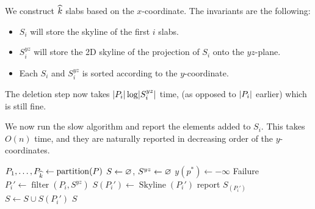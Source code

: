 \begin{solution}
    We construct $\widehat{k}$ slabs based on the $x$-coordinate.
    The invariants are the following:
    \begin{itemize}
        \item $S_i$ will store the skyline of the first $i$ slabs.
        \item $S_i^{yz}$ will store the 2D skyline of the projection of
            $S_i$ onto the $yz$-plane.
        \item Each $S_i$ and $S_i^{yz}$ is sorted according to the
            $y$-coordinate.
    \end{itemize}
    The deletion step now takes $\lvert P_i\rvert \log \lvert S_i^{yz}\rvert$ time,
    (as opposed to $\lvert P_i\rvert$ earlier)
    which is still fine.

    We now run the slow algorithm and report the elements added to $S_i$.
    This takes $O(n)$ time, and they are naturally reported in decreasing
    order of the $y$-coordinates.
    \begin{algo}
            \State $P_1, \ldots, P_{\widehat{k}} \gets
                \operatorname{partition}(P)$
            \State $S \gets \varnothing$, $S^{yz} \gets \varnothing$
            \State $y(p^*) \gets -\infty$
                    \State \Return Failure
                \Else
                    \State $P_i' \gets \operatorname{filter}(P_i, S^{yz})$
                    \State $S(P_i') \gets \operatorname{Skyline}(P_i')$
                    \State report $S_(P_i')$
                    \State $S \gets S \cup S(P_i')$
                \EndIf
            \EndFor
            \State \Return $S$
        \EndFn
    \end{algo}
\end{solution}
